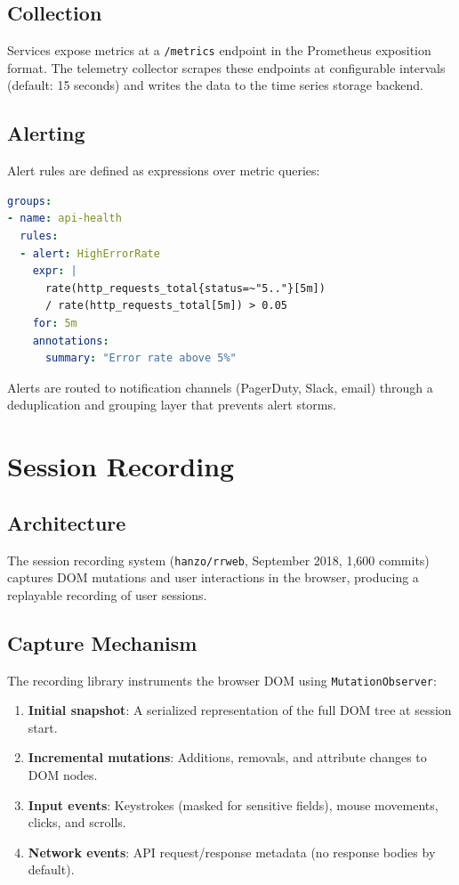 \documentclass[11pt,a4paper]{article}
\begin{document}
\subsection{Collection}

Services expose metrics at a \texttt{/metrics} endpoint in the Prometheus exposition format. The telemetry collector scrapes these endpoints at configurable intervals (default: 15 seconds) and writes the data to the time series storage backend.

\subsection{Alerting}

Alert rules are defined as expressions over metric queries:

\begin{lstlisting}[language=YAML,caption=Alert rule definition.]
groups:
- name: api-health
  rules:
  - alert: HighErrorRate
    expr: |
      rate(http_requests_total{status=~"5.."}[5m])
      / rate(http_requests_total[5m]) > 0.05
    for: 5m
    annotations:
      summary: "Error rate above 5%"
\end{lstlisting}

Alerts are routed to notification channels (PagerDuty, Slack, email) through a deduplication and grouping layer that prevents alert storms.

\section{Session Recording}

\subsection{Architecture}

The session recording system (\texttt{hanzo/rrweb}, September 2018, 1{,}600 commits) captures DOM mutations and user interactions in the browser, producing a replayable recording of user sessions.

\subsection{Capture Mechanism}

The recording library instruments the browser DOM using \texttt{MutationObserver}:

\begin{enumerate}
    \item \textbf{Initial snapshot}: A serialized representation of the full DOM tree at session start.
    \item \textbf{Incremental mutations}: Additions, removals, and attribute changes to DOM nodes.
    \item \textbf{Input events}: Keystrokes (masked for sensitive fields), mouse movements, clicks, and scrolls.
    \item \textbf{Network events}: API request/response metadata (no response bodies by default).
\end{enumerate}
\end{document}
